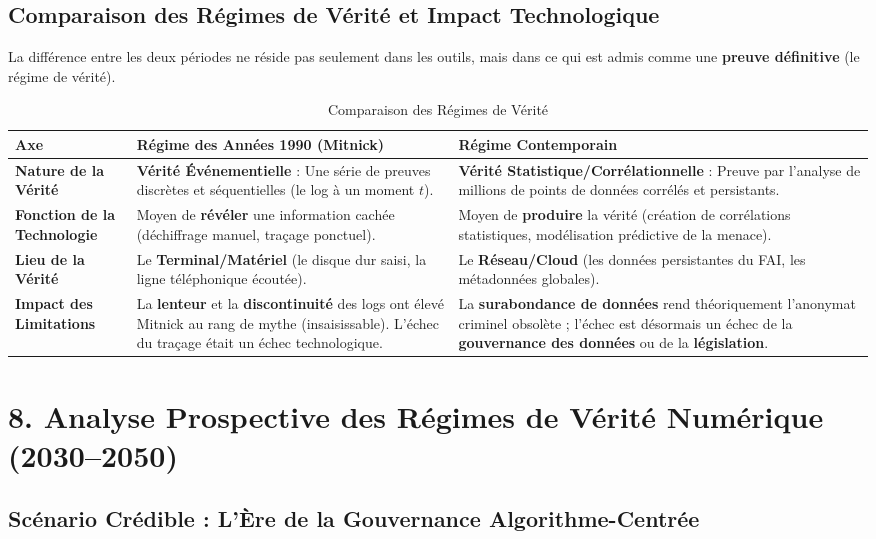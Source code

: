 \documentclass[a4paper,12pt]{report}
\begin{document}
	\subsection*{Comparaison des Régimes de Vérité et Impact Technologique}
	La différence entre les deux périodes ne réside pas seulement dans les outils, mais dans ce qui est admis comme une \textbf{preuve définitive} (le régime de vérité).
	\begin{table}[h]
		\centering
		\caption{Comparaison des Régimes de Vérité}
		\label{tab:regimes_verite}
		\begin{tabular}{|p{3cm}|p{5cm}|p{5cm}|}
			\hline
			\textbf{Axe} & \textbf{Régime des Années 1990 (Mitnick)} & \textbf{Régime Contemporain} \\
			\hline
			\textbf{Nature de la Vérité} & \textbf{Vérité Événementielle} : Une série de preuves discrètes et séquentielles (le log à un moment $t$). & \textbf{Vérité Statistique/Corrélationnelle} : Preuve par l'analyse de millions de points de données corrélés et persistants. \\
			\hline
			\textbf{Fonction de la Technologie} & Moyen de \textbf{révéler} une information cachée (déchiffrage manuel, traçage ponctuel). & Moyen de \textbf{produire} la vérité (création de corrélations statistiques, modélisation prédictive de la menace). \\
			\hline
			\textbf{Lieu de la Vérité} & Le \textbf{Terminal/Matériel} (le disque dur saisi, la ligne téléphonique écoutée). & Le \textbf{Réseau/Cloud} (les données persistantes du FAI, les métadonnées globales). \\
			\hline
			\textbf{Impact des Limitations} & La \textbf{lenteur} et la \textbf{discontinuité} des logs ont élevé Mitnick au rang de mythe (insaisissable). L'échec du traçage était un échec technologique. & La \textbf{surabondance de données} rend théoriquement l'anonymat criminel obsolète ; l'échec est désormais un échec de la \textbf{gouvernance des données} ou de la \textbf{législation}. \\
			\hline
		\end{tabular}
	\end{table}
	
	
	
	\section*{8. Analyse Prospective des Régimes de Vérité Numérique (2030--2050)}
	
	\subsection*{Scénario Crédible : L’Ère de la Gouvernance Algorithme-Centrée}
\end{document}
